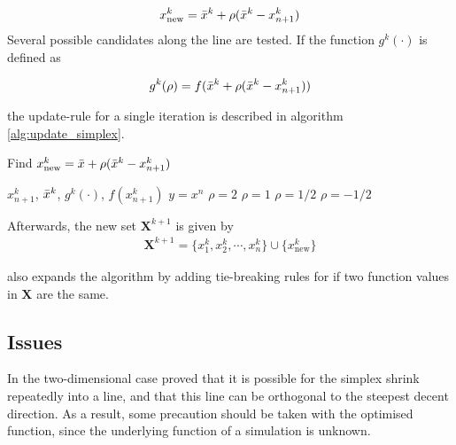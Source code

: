 \begin{align}
    x_{\text{new}}^k = \Bar{x}^k + \rho (\Bar{x}^k - x_{n+1}^k) 
\end{align}
Several possible candidates along the line are tested. If the function $g^k(\cdot)$ is defined as 

\begin{align}
    g^k(\rho) = f( \Bar{x}^k + \rho (\Bar{x}^k - x_{n+1}^k)  )
\end{align}

\noindent
the update-rule for a single iteration is described in algorithm \ref{alg:update_simplex}. 
\begin{algorithm}
\label{alg:update_simplex}
\caption{Find $x_{\text{new}}^k = \Bar{x} + \rho(\Bar{x}^k - x^k_{n+1})$}
\begin{algorithmic}
\REQUIRE $x^k_{n+1} $, $\Bar{x}^k$, $g^k(\cdot)$, $f(x^k_{n+1})$
\ENSURE $y = x^n$
        \STATE $\rho =2$
    \ELSE
        \STATE $\rho = 1$
    \ENDIF
{}
        \STATE $\rho =1/2$
\ELSE 
    \STATE $\rho = -1/2$
\ENDIF
\end{algorithmic}
\end{algorithm}


Afterwards, the new set $\mathbf{X}^{k+1}$ is given by 
\begin{align}
    \mathbf{X}^{k+1} = \{x^k_1,x^k_2, \cdots, x^k_n \} \cup \{x_{\text{new}}^k \}
\end{align}

\noindent
\cite{Nelder_Mead_source} also expands the algorithm by adding tie-breaking rules for if two function values in $\mathbf{X}$ are the same. 

\subsection{Issues}
In the two-dimensional case \cite{Nelder_Mead_convergence_issues} proved that it is possible for the simplex shrink repeatedly into a line, and that this line can be orthogonal to the steepest decent direction. As a result, some precaution should be taken with the optimised function, since the underlying function of a simulation is unknown. 


